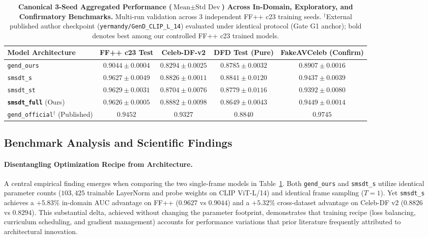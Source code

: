 \begin{table}[t]
\centering
\small
\caption{\textbf{Canonical 3-Seed Aggregated Performance ($\text{Mean} \pm \text{Std Dev}$) Across In-Domain, Exploratory, and Confirmatory Benchmarks.} Multi-run validation across 3 independent FF++ c23 training seeds. $^\dagger$External published author checkpoint (\texttt{yermandy/GenD\_CLIP\_L\_14}) evaluated under identical protocol (Gate G1 anchor); bold denotes best among our controlled FF++ c23 trained models.}
\label{tab:aggregated_results}
\begin{tabular}{l c c c c}
\toprule
\textbf{Model Architecture} & \textbf{FF++ c23 Test} & \textbf{Celeb-DF-v2} & \textbf{DFD Test (Pure)} & \textbf{FakeAVCeleb (Confirm)} \\
\midrule
\texttt{gend\_ours} & $0.9044 \pm 0.0004$ & $0.8294 \pm 0.0025$ & $0.8785 \pm 0.0032$ & $0.8907 \pm 0.0016$ \\
\texttt{smsdt\_s}    & $0.9627 \pm 0.0049$ & $0.8826 \pm 0.0011$ & $\mathbf{0.8841 \pm 0.0120}$ & $0.9437 \pm 0.0039$ \\
\texttt{smsdt\_st}   & $\mathbf{0.9629 \pm 0.0031}$ & $0.8704 \pm 0.0076$ & $0.8779 \pm 0.0116$ & $0.9392 \pm 0.0080$ \\
\textbf{\texttt{smsdt\_full}} (Ours) & $0.9626 \pm 0.0005$ & $\mathbf{0.8882 \pm 0.0098}$ & $0.8649 \pm 0.0043$ & $\mathbf{0.9449 \pm 0.0014}$ \\
\midrule
\texttt{gend\_official}$^\dagger$ (Published) & $0.9452$ & $0.9327$ & $0.8840$ & $0.9745$ \\
\bottomrule
\end{tabular}
\end{table}

\subsection{Benchmark Analysis and Scientific Findings}
\paragraph{Disentangling Optimization Recipe from Architecture.}
A central empirical finding emerges when comparing the two single-frame models in Table~\ref{tab:aggregated_results}. Both \texttt{gend\_ours} and \texttt{smsdt\_s} utilize identical parameter counts ($103{,}425$ trainable LayerNorm and probe weights on CLIP ViT-L/14) and identical frame sampling ($T=1$). Yet \texttt{smsdt\_s} achieves a $+5.83\%$ in-domain AUC advantage on FF++ ($0.9627$ vs $0.9044$) and a $+5.32\%$ cross-dataset advantage on Celeb-DF v2 ($0.8826$ vs $0.8294$). This substantial delta, achieved without changing the parameter footprint, demonstrates that training recipe (loss balancing, curriculum scheduling, and gradient management) accounts for performance variations that prior literature frequently attributed to architectural innovation.

